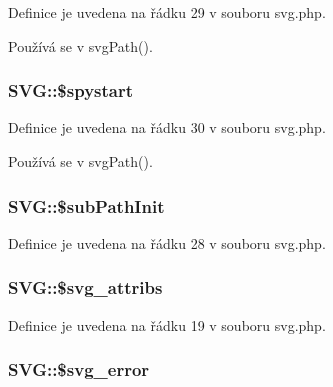 Definice je uvedena na řádku 29 v souboru svg.\-php.



Používá se v svg\-Path().

\hypertarget{class_s_v_g_a52ac5b582840093ac704077a05521b7c}{
\subsubsection[{\$spystart}]{\setlength{\rightskip}{0pt plus 5cm}S\-V\-G\-::\$spystart}}\label{class_s_v_g_a52ac5b582840093ac704077a05521b7c}


Definice je uvedena na řádku 30 v souboru svg.\-php.



Používá se v svg\-Path().

\hypertarget{class_s_v_g_af3ba85f87094ababec3695fe55559bdf}{
\subsubsection[{\$sub\-Path\-Init}]{\setlength{\rightskip}{0pt plus 5cm}S\-V\-G\-::\$sub\-Path\-Init}}\label{class_s_v_g_af3ba85f87094ababec3695fe55559bdf}


Definice je uvedena na řádku 28 v souboru svg.\-php.

\hypertarget{class_s_v_g_aadddae146f2572ce7596765053e55b59}{
\subsubsection[{\$svg\-\_\-attribs}]{\setlength{\rightskip}{0pt plus 5cm}S\-V\-G\-::\$svg\-\_\-attribs}}\label{class_s_v_g_aadddae146f2572ce7596765053e55b59}


Definice je uvedena na řádku 19 v souboru svg.\-php.

\hypertarget{class_s_v_g_aa1a28f8b36a24698b86d8b845b9bf34a}{
\subsubsection[{\$svg\-\_\-error}]{\setlength{\rightskip}{0pt plus 5cm}S\-V\-G\-::\$svg\-\_\-error}}\label{class_s_v_g_aa1a28f8b36a24698b86d8b845b9bf34a}


